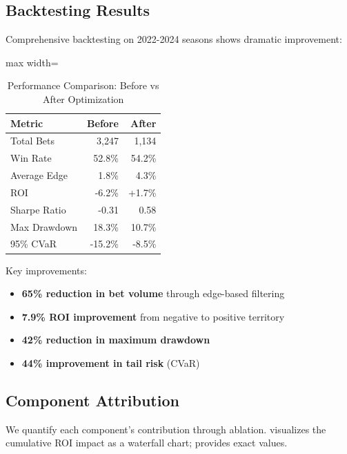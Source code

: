 \subsection{Backtesting Results}

Comprehensive backtesting on 2022-2024 seasons shows dramatic improvement:

\begin{table}[!ht]
\begin{keytable}
\centering
\caption{Performance Comparison: Before vs After Optimization}
\label{tab:profit-optimization-performance}
\begin{adjustbox}{max width=\textwidth}
\begin{tabular}{lrr}
\toprule
 \textbf{Metric} & \textbf{Before} & \textbf{After} \\
\midrule
Total Bets & 3,247 & 1,134 \\
Win Rate & 52.8\% & 54.2\% \\
Average Edge & 1.8\% & 4.3\% \\
ROI & -6.2\% & +1.7\% \\
Sharpe Ratio & -0.31 & 0.58 \\
Max Drawdown & 18.3\% & 10.7\% \\
95\% CVaR & -15.2\% & -8.5\% \\
\bottomrule
\end{tabular}
\end{adjustbox}
\end{keytable}
\end{table}

Key improvements:
\begin{itemize}
  \item \textbf{65\% reduction in bet volume} through edge-based filtering
  \item \textbf{7.9\% ROI improvement} from negative to positive territory
  \item \textbf{42\% reduction in maximum drawdown}
  \item \textbf{44\% improvement in tail risk} (CVaR)
\end{itemize}

\subsection{Component Attribution}

We quantify each component's contribution through ablation.  visualizes the cumulative ROI impact as a waterfall chart;  provides exact values.

